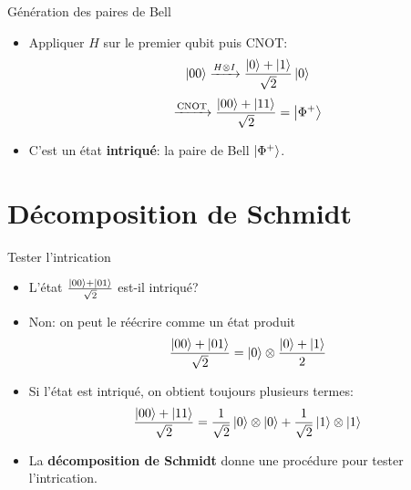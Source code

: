 \documentclass[aspectratio=169,12pt]{beamer}
\begin{document}
\begin{frame}{Génération des paires de Bell}
    \begin{itemize}[<+->]
      \setlength{\itemsep}{0.55em}
      \item Appliquer $H$ sur le premier qubit puis CNOT:
      $$\ket{00} \xrightarrow{H\otimes I} \frac{\ket{0}+\ket{1}}{\sqrt{2}}\ket{0}$$
      $$\xrightarrow{\text{CNOT}} \frac{\ket{00}+\ket{11}}{\sqrt{2}} = \ket{\Phi^+}$$
      \item C'est un état \textbf{intriqué}: la paire de Bell $\ket{\Phi^+}$.
    \end{itemize}
\end{frame}

\section{Décomposition de Schmidt}

\begin{frame}{Tester l'intrication}
  \begin{itemize}[<+->]
    \item L'état $\frac{\ket{00} + \ket{01}}{\sqrt{2}}$ est-il intriqué? 
    \item Non: on peut le réécrire comme un état produit
    \begin{equation*}
      \frac{\ket{00} + \ket{01}}{\sqrt{2}} = \ket{0} \otimes \frac{\ket{0}+\ket{1}}{2}
    \end{equation*} 
    \item Si l'état est intriqué, on obtient toujours plusieurs termes:
    \begin{equation*}
      \frac{\ket{00} + \ket{11}}{\sqrt{2}} = \frac{1}{\sqrt{2}} \ket{0} \otimes \ket{0} + \frac{1}{\sqrt{2}} \ket{1} \otimes \ket{1}
    \end{equation*}
    \item La \textbf{décomposition de Schmidt} donne une procédure pour tester l'intrication.
  \end{itemize}
\end{frame}
\end{document}
